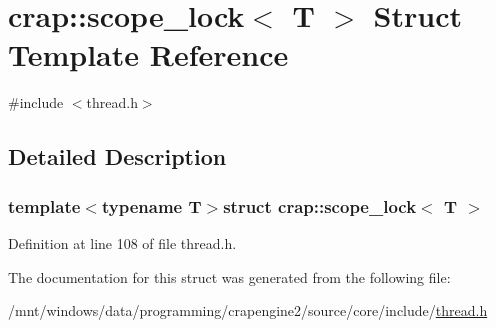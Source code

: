 \hypertarget{structcrap_1_1scope__lock}{\section{crap\+:\+:scope\+\_\+lock$<$ T $>$ Struct Template Reference}
\label{structcrap_1_1scope__lock}
}


{\ttfamily \#include $<$thread.\+h$>$}



\subsection{Detailed Description}
\subsubsection*{template$<$typename T$>$struct crap\+::scope\+\_\+lock$<$ T $>$}



Definition at line 108 of file thread.\+h.



The documentation for this struct was generated from the following file\+:\begin{DoxyCompactItemize}
\item 
/mnt/windows/data/programming/crapengine2/source/core/include/\hyperlink{thread_8h}{thread.\+h}\end{DoxyCompactItemize}
